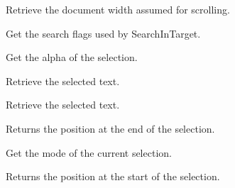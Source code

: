 
Retrieve the document width assumed for scrolling.


\label{wxstyledtextctrlgetsearchflags}


Get the search flags used by SearchInTarget.


\label{wxstyledtextctrlgetselalpha}


Get the alpha of the selection.


\label{wxstyledtextctrlgetselectedtext}


Retrieve the selected text.


\label{wxstyledtextctrlgetselectedtextraw}


Retrieve the selected text.


\label{wxstyledtextctrlgetselection}



\label{wxstyledtextctrlgetselectionend}


Returns the position at the end of the selection.


\label{wxstyledtextctrlgetselectionmode}


Get the mode of the current selection.


\label{wxstyledtextctrlgetselectionstart}


Returns the position at the start of the selection.


\label{wxstyledtextctrlgetstatus}


